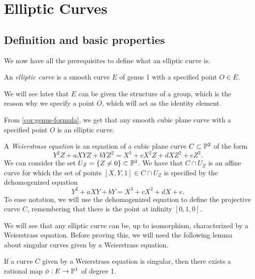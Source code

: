 \section{Elliptic Curves}

\subsection{Definition and basic properties}
\label{subs:definition-properties}

We now have all the prerequisites to define what an elliptic curve is.
\begin{definition}
	An \emph{elliptic curve} is a smooth curve $E$ of genus 1 with a specified point
	$O \in E$.
\end{definition}
We will see later that $E$ can be given the structure of a group, which is the
reason why we
specify a point $O$, which will act as the identity element.

\begin{remark}
	From \ref{cor:genus-formula}, we get that any smooth cubic
	plane curve with a specified point $O$ is an elliptic curve.
\end{remark}

A \emph{Weierstrass equation} is an equation of a 
cubic plane curve $C \subset \mathbb{P}^2$ of the form
\begin{equation*}
	Y^2Z + aXYZ + bYZ^2 = X^3 + cX^2Z + dXZ^2 + eZ^3.
\end{equation*}
We can consider the set $U_Z = \{Z \neq 0\} \subset \mathbb{P}^2$. We have that
$C \cap U_Z$ is an affine curve for which the set of points
$[X, Y, 1] \in C\cap U_Z$ is specified by the dehomogenized equation
\begin{equation*}
	Y^2 + aXY + bY = X^3 + cX^2 + dX + e.
\end{equation*}
To ease notation, we will 
use the dehomogenized equation to define the projective curve $C$,
remembering that there is the point at infinity $[0, 1, 0]$.

We will see that any elliptic curve can be, up to isomorphism, 
characterized by a Weierstrass equation. Before proving this, we will need
the following lemma about singular curves given by a 
Weierstrass equation.
\begin{lemma}
	\label{lem:deg-1-singular}
	If a curve $C$ given by a Weierstrass equation is singular,
	then there exists a rational map $\phi:E \to \mathbb{P}^1$ of degree 1.
\end{lemma}

